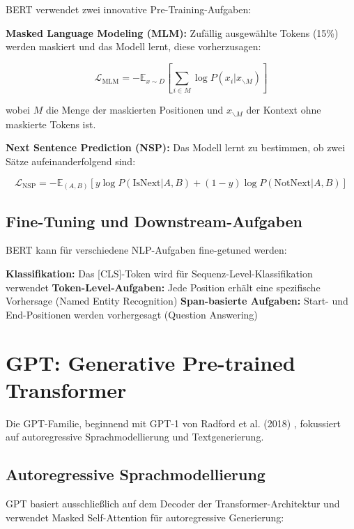 BERT verwendet zwei innovative Pre-Training-Aufgaben:

\textbf{Masked Language Modeling (MLM):}
Zufällig ausgewählte Tokens (15\%) werden maskiert und das Modell lernt, diese vorherzusagen:

\begin{equation}
\mathcal{L}_{\text{MLM}} = -\mathbb{E}_{x \sim D} \left[ \sum_{i \in M} \log P(x_i | x_{\backslash M}) \right]
\end{equation}

wobei $M$ die Menge der maskierten Positionen und $x_{\backslash M}$ der Kontext ohne maskierte Tokens ist.

\textbf{Next Sentence Prediction (NSP):}
Das Modell lernt zu bestimmen, ob zwei Sätze aufeinanderfolgend sind:

\begin{equation}
\mathcal{L}_{\text{NSP}} = -\mathbb{E}_{(A,B)} \left[ y \log P(\text{IsNext} | A, B) + (1-y) \log P(\text{NotNext} | A, B) \right]
\end{equation}

\subsection{Fine-Tuning und Downstream-Aufgaben}

BERT kann für verschiedene NLP-Aufgaben fine-getuned werden:

\textbf{Klassifikation:} Das [CLS]-Token wird für Sequenz-Level-Klassifikation verwendet
\textbf{Token-Level-Aufgaben:} Jede Position erhält eine spezifische Vorhersage (Named Entity Recognition)
\textbf{Span-basierte Aufgaben:} Start- und End-Positionen werden vorhergesagt (Question Answering)

\section{GPT: Generative Pre-trained Transformer}

Die GPT-Familie, beginnend mit GPT-1 von Radford et al. (2018) \cite{radford2018improving}, fokussiert auf autoregressive Sprachmodellierung und Textgenerierung.

\subsection{Autoregressive Sprachmodellierung}

GPT basiert ausschließlich auf dem Decoder der Transformer-Architektur und verwendet Masked Self-Attention für autoregressive Generierung:

